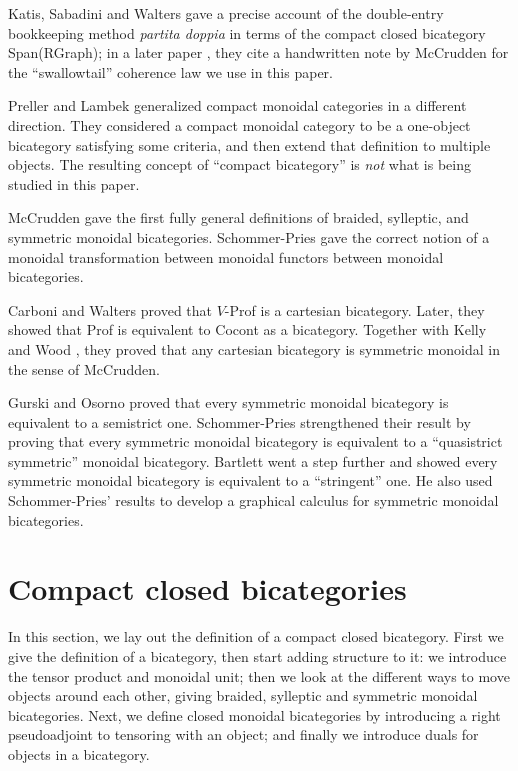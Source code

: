 \documentclass{article}
\begin{document}
Katis, Sabadini and Walters \cite{KSW98} gave a precise account of the double-entry bookkeeping method {\em partita doppia} in terms of the compact closed bicategory Span(RGraph); in a later paper \cite{KW99}, they cite a handwritten note by McCrudden for the ``swallowtail'' coherence law we use in this paper.

Preller and Lambek \cite{PL07} generalized compact monoidal categories in a different direction.  They considered a compact monoidal category to be a one-object bicategory satisfying some criteria, and then extend that definition to multiple objects.  The resulting concept of ``compact bicategory'' is {\em not} what is being studied in this paper.

McCrudden \cite{McCrudden} gave the first fully general definitions of braided, sylleptic, and symmetric monoidal bicategories.  Schommer-Pries \cite{SPT} gave the correct notion of a monoidal transformation between monoidal functors between monoidal bicategories.

Carboni and Walters \cite{CW87} proved that $V$-Prof is a cartesian bicategory.  Later, they showed \cite{CW04} that Prof is equivalent to Cocont as a bicategory.  Together with Kelly and Wood \cite{CKWW08}, they proved that any cartesian bicategory is symmetric monoidal in the sense of McCrudden.

Gurski and Osorno \cite{GO} proved that every symmetric monoidal bicategory is equivalent to a semistrict one. Schommer-Pries \cite{SPT} strengthened their result by proving that every symmetric monoidal bicategory is equivalent to a ``quasistrict symmetric'' monoidal bicategory. Bartlett \cite{Bartlett} went a step further and showed every symmetric monoidal bicategory is equivalent to a ``stringent'' one.  He also used Schommer-Pries' results to develop a graphical calculus for symmetric monoidal bicategories.

\section{Compact closed bicategories}
\label{definition}

In this section, we lay out the definition of a compact closed bicategory.  First we give the definition of a bicategory, then start adding structure to it: we introduce the tensor product and monoidal unit; then we look at the different ways to move objects around each other, giving braided, sylleptic and symmetric monoidal bicategories. Next, we define closed monoidal bicategories by introducing a right pseudoadjoint to tensoring with an object; and finally we introduce duals for objects in a bicategory.
\end{document}
